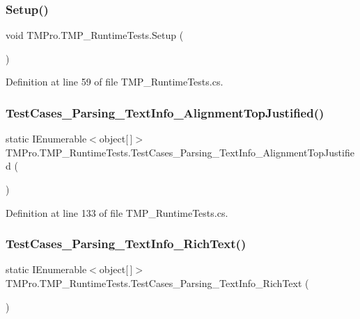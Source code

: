 \subsubsection{\texorpdfstring{Setup()}{Setup()}}
{\footnotesize\ttfamily void T\+M\+Pro.\+T\+M\+P\+\_\+\+Runtime\+Tests.\+Setup (\begin{DoxyParamCaption}{ }\end{DoxyParamCaption})}



Definition at line 59 of file T\+M\+P\+\_\+\+Runtime\+Tests.\+cs.

\mbox{\label{class_t_m_pro_1_1_t_m_p___runtime_tests_afd5763d35287bd9ab11613a4649d4dab}} 
\subsubsection{\texorpdfstring{TestCases\_Parsing\_TextInfo\_AlignmentTopJustified()}{TestCases\_Parsing\_TextInfo\_AlignmentTopJustified()}}
{\footnotesize\ttfamily static I\+Enumerable$<$object\mbox{[}$\,$\mbox{]}$>$ T\+M\+Pro.\+T\+M\+P\+\_\+\+Runtime\+Tests.\+Test\+Cases\+\_\+\+Parsing\+\_\+\+Text\+Info\+\_\+\+Alignment\+Top\+Justified (\begin{DoxyParamCaption}{ }\end{DoxyParamCaption})\hspace{0.3cm}{\ttfamily [static]}}



Definition at line 133 of file T\+M\+P\+\_\+\+Runtime\+Tests.\+cs.

\mbox{\label{class_t_m_pro_1_1_t_m_p___runtime_tests_a807d0252cdcc5e703a924c22747feb38}} 
\subsubsection{\texorpdfstring{TestCases\_Parsing\_TextInfo\_RichText()}{TestCases\_Parsing\_TextInfo\_RichText()}}
{\footnotesize\ttfamily static I\+Enumerable$<$object\mbox{[}$\,$\mbox{]}$>$ T\+M\+Pro.\+T\+M\+P\+\_\+\+Runtime\+Tests.\+Test\+Cases\+\_\+\+Parsing\+\_\+\+Text\+Info\+\_\+\+Rich\+Text (\begin{DoxyParamCaption}{ }\end{DoxyParamCaption})\hspace{0.3cm}{\ttfamily [static]}}



